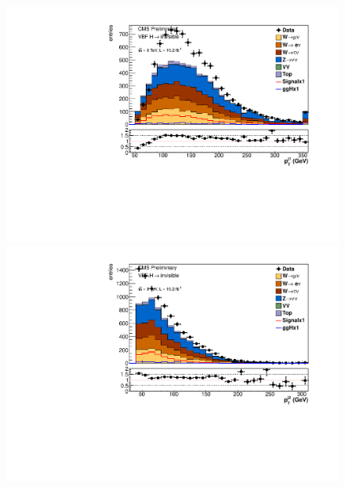 \begin{figure}
    \includegraphics[width=.6\largefigwidth]{plots/parked/AN-14-243-figs/output_presel/nunu_jet1_pt.pdf}
    \includegraphics[width=.6\largefigwidth]{plots/parked/AN-14-243-figs/output_presel/nunu_jet2_pt.pdf}


\end{figure}
